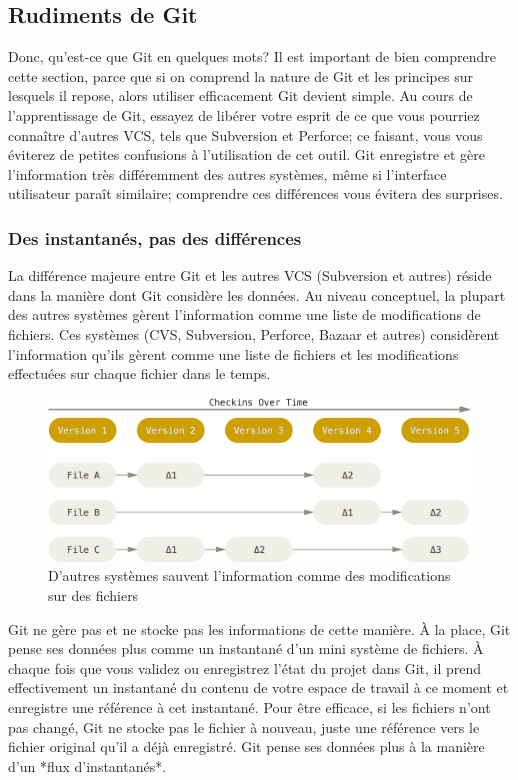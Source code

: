 \subsection{Rudiments de Git}

Donc, qu'est-ce que Git en quelques mots?
Il est important de bien comprendre cette section, parce que si on comprend la nature de Git et les principes sur lesquels il repose, alors utiliser efficacement Git devient simple.
Au cours de l'apprentissage de Git, essayez de libérer votre esprit de ce que vous pourriez connaître d'autres VCS, tels que Subversion et Perforce;
ce faisant, vous vous éviterez de petites confusions à l'utilisation de cet outil.
Git enregistre et gère l'information très différemment des autres systèmes, même si l'interface utilisateur paraît similaire;
comprendre ces différences vous évitera des surprises.

\subsubsection{Des instantanés, pas des différences}

La différence majeure entre Git et les autres VCS (Subversion et autres) réside dans la manière dont Git considère les données.
Au niveau conceptuel, la plupart des autres systèmes gèrent l'information comme une liste de modifications de fichiers.
Ces systèmes (CVS, Subversion, Perforce, Bazaar et autres) considèrent l'information qu'ils gèrent comme une liste de fichiers et les modifications effectuées sur chaque fichier dans le temps.

\begin{figure}[H]
  \centering
  \includegraphics{images/deltas}
  \caption{D'autres systèmes sauvent l'information comme des modifications sur des fichiers}
  \label{fig:git:deltas}
\end{figure}

Git ne gère pas et ne stocke pas les informations de cette manière.
À la place, Git pense ses données plus comme un instantané d'un mini système de fichiers.
À chaque fois que vous validez ou enregistrez l'état du projet dans Git, il prend effectivement un instantané du contenu de votre espace de travail à ce moment et enregistre une référence à cet instantané.
Pour être efficace, si les fichiers n'ont pas changé, Git ne stocke pas le fichier à nouveau, juste une référence vers le fichier original qu'il a déjà enregistré.
Git pense ses données plus à la manière d'un *flux d'instantanés*.


